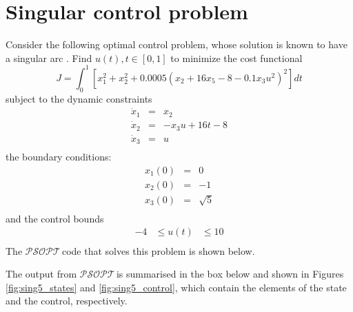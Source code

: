 \documentclass[a4paper,11pt]{report}    %
\newcommand{\psopt}{$\mathcal{PSOPT}$\,}  %
\newenvironment{shadedframe}{%
  \def\FrameCommand{\fcolorbox{black}{shadecolor}}%
  \MakeFramed {\FrameRestore}}
{\endMakeFramed}
\begin{document}
\section{Singular control problem}

Consider the following optimal control problem, whose solution is known to have a singular arc \cite{Luus:02, Rutquist:09}.  Find $u(t) , t \in [0, 1]$ 
to minimize the cost functional
\begin{equation}
  J = \int_0^1 [x_1^2+x_2^2 + 0.0005(x_2+16x_5 - 8 - 0.1 x_3 u^2)^2 ]dt
\end{equation}
subject to the dynamic constraints
\begin{equation}
  \begin{array}{lcl}
   \dot x_1 &=& x_2 \\
   \dot x_2 &=& -x_3 u + 16 t -8\\
   \dot x_3 &=& u\\
  \end{array}
\end{equation}
the boundary conditions:
 \begin{equation}
  \begin{array}{lcl}
   x_1(0) &=& 0 \\
   x_2(0) &=& -1 \\
   x_3(0) &=& \sqrt{5} \\
  \end{array}
\end{equation}
and the control bounds
\begin{equation}
\begin{aligned}
  -4 &\le u(t) &\le 10 \\
\end{aligned}
\end{equation}
The
\psopt code that solves this problem is shown below.  

\tiny
\begin{shadedframe}

\end{shadedframe}
\normalsize

The output from \psopt is summarised in the box below and shown in Figures \ref{fig:sing5_states} and \ref{fig:sing5_control}, which contain the elements
of the state and the control, respectively.

\begin{shadedframe}

\end{shadedframe}
\end{document}
